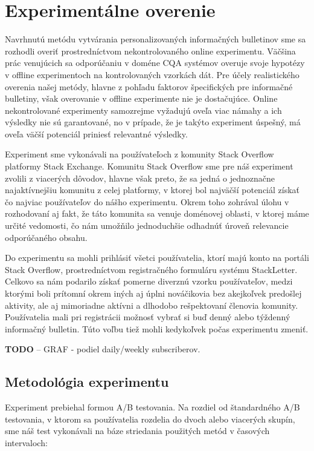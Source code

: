 \afterpage{\blankpage}
\newpage
\chapter{Experimentálne overenie}
\label{sec:experiment}

Navrhnutú metódu vytvárania personalizovaných informačných bulletinov sme sa rozhodli overiť prostredníctvom
nekontrolovaného online experimentu. Väčšina prác venujúcich sa odporúčaniu v doméne CQA systémov overuje
svoje hypotézy v offline experimentoch na kontrolovaných vzorkách dát. Pre účely realistického overenia našej metódy, hlavne
z pohľadu faktorov špecifických pre informačné bulletiny, však overovanie v offline experimente nie je dostačujúce.
Online nekontrolované experimenty samozrejme vyžadujú oveľa viac námahy a ich výsledky nie sú garantované, no v prípade,
že je takýto experiment úspešný, má oveľa väčší potenciál priniesť relevantné výsledky.

Experiment sme vykonávali na používateľoch z komunity Stack Overflow platformy Stack Exchange.
Komunitu Stack Overflow sme pre náš experiment zvolili z viacerých dôvodov, hlavne však preto,
že sa jedná o jednoznačne najaktívnejšiu komunitu z celej platformy, v ktorej bol najväčší potenciál získať čo najviac
používateľov do nášho experimentu. Okrem toho zohrával úlohu v rozhodovaní aj fakt, že táto komunita sa venuje doménovej
oblasti, v ktorej máme určité vedomosti, čo nám umožňilo jednoduchšie odhadnúť úroveň relevancie odporúčaného obsahu.

Do experimentu sa mohli prihlásiť všetci používatelia, ktorí majú konto na portáli Stack Overflow, prostredníctvom
registračného formuláru systému StackLetter. Celkovo sa nám podarilo získať pomerne diverznú vzorku používateľov,
medzi ktorými boli prítomní okrem iných aj úplni nováčikovia bez akejkoľvek predošlej aktivity, ale aj mimoriadne aktívni
a dlhodobo rešpektovaní členovia komunity. Používatelia mali pri registrácii možnosť vybrať si buď denný alebo týždenný
informačný bulletin. Túto voľbu tiež mohli kedykoľvek počas experimentu zmeniť.

\textbf{TODO} -- GRAF - podiel daily/weekly subscriberov.

\section{Metodológia experimentu}
Experiment prebiehal formou A/B testovania. Na rozdiel od štandardného A/B testovania, v ktorom sa používatelia rozdelia
do dvoch alebo viacerých skupín, sme náš test vykonávali na báze striedania použitých metód v časových intervaloch:

